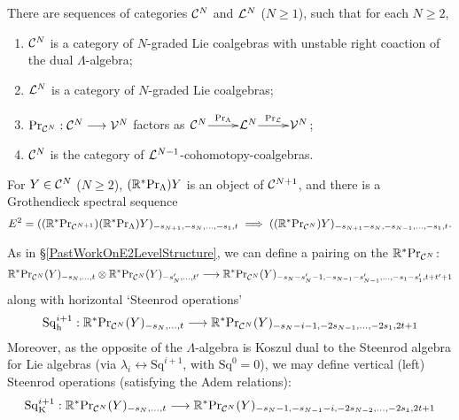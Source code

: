 \documentclass[11pt]{article}
\newcommand{\Sq}{\mathrm{Sq}}
\begin{document}
\begin{prop}
There are sequences of categories $\mathcal{C}^N$ and $\mathcal{L}^N$ ($N\geq1$), such that for each $N\geq2$, 
\begin{enumerate}\squishlist
\setlength{\parindent}{.25in}
\item $\mathcal{C}^N$ is a category of $N$-graded Lie coalgebras with unstable right coaction of the dual $\Lambda$-algebra;
\item $\mathcal{L}^N$ is a category of $N$-graded Lie coalgebras;
\item $\textup{Pr}_{\mathcal{C}^N}:\mathcal{C}^N\longrightarrow\mathcal{V}^N$ factors as $\xymatrix@R=4mm@1{
\calC^N\ar[r]^-{\textup{Pr}_\Lambda}
&%
\calL^N\ar[r]^-{\textup{Pr}_\calL}
&%
\calV^N%
}$;
\item $\mathcal{C}^N$ is the category of $\mathcal{L}^{N-1}$-cohomotopy-coalgebras.
\end{enumerate}
For $Y\in\mathcal{C}^N$ ($N\geq2$), $(\mathbb{R}^*\textup{Pr}_\Lambda)Y$ is an object of $\mathcal{C}^{N+1}$, and there is a Grothendieck spectral sequence
\[E^2=((\mathbb{R}^{*}\textup{Pr}_{\mathcal{C}^{N+1}})(\mathbb{R}^*\textup{Pr}_\Lambda)Y)_{-s_{N+1},-s_N,\ldots,-s_1,t}\implies ((\mathbb{R}^{*}\textup{Pr}_{\mathcal{C}^{N}})Y)_{-s_{N+1}-s_N,-s_{N-1},\ldots,-s_1,t}.\]
%
%
%
\end{prop}
As in \S\ref{PastWorkOnE2LevelStructure}, we can define a pairing on the $\mathbb{R}^*\textup{Pr}_{\mathcal{C}^N}$:
\[\mathbb{R}^*\textup{Pr}_{\mathcal{C}^N}(Y)_{-s_{N},\ldots,t}\otimes \mathbb{R}^*\textup{Pr}_{\mathcal{C}^N}(Y)_{-s_{N}',\ldots,t'}\longrightarrow \mathbb{R}^*\textup{Pr}_{\mathcal{C}^N}(Y)_{-s_{N}-s_{N}'-1,-s_{N-1}-s_{N-1}',\ldots,-s_1-s_1',t+t'+1}\]
along with horizontal `Steenrod operations'
\[\Sq^{i+1}_\textup{h}:\mathbb{R}^*\textup{Pr}_{\calC^N}(Y)_{-s_{N},\ldots,t} \to \mathbb{R}^*\textup{Pr}_{\calC^N}(Y)_{-s_{N}-i-1,-2s_{N-1},\ldots,-2s_1,2t+1}\]
Moreover, as the opposite of the $\Lambda$-algebra is Koszul dual to the Steenrod algebra for Lie algebras (via $\lambda_i\leftrightarrow \Sq^{i+1}$, with $\Sq^0=0$), we may define vertical (left) Steenrod operations (satisfying the Adem relations):
\[\Sq^{i+1}_\textup{K}:\mathbb{R}^*\textup{Pr}_{\calC^N}(Y)_{-s_{N},\ldots,t} \to \mathbb{R}^*\textup{Pr}_{\calC^N}(Y)_{-s_{N}-1,-s_{N-1}-i,-2s_{N-2},\ldots,-2s_1,2t+1}\]
\end{document}
